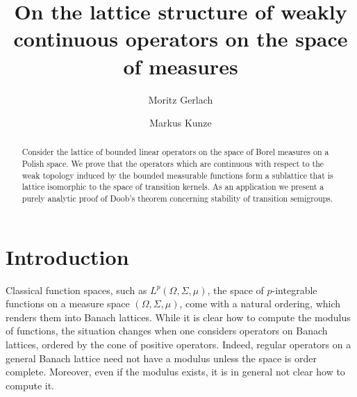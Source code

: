 \documentclass{amsart}
\numberwithin{equation}{section}
\theoremstyle{remark}
\theoremstyle{definition}
\begin{document}
\title[Lattice of weakly continuous operators]{On the lattice structure of weakly continuous operators on the space of measures}
\author{Moritz Gerlach}
\address{Moritz Gerlach\\University of Ulm\\Institute of Applied Analysis\\89069 Ulm\\Germany}

\author{Markus Kunze}
\address{Markus Kunze\\DFG Research Training Group 1100\\University of Ulm\\89069 Ulm\\Germany}
\begin{abstract}
Consider the lattice of bounded linear operators on the space of Borel measures on a Polish space. We prove
that the operators which are continuous with respect to the weak topology induced by the bounded measurable functions form a sublattice
that is lattice isomorphic to the space of transition kernels.
As an application we present a purely analytic proof of Doob's theorem concerning stability of transition semigroups.
\end{abstract}


\maketitle

\section{Introduction}

Classical function spaces, such as 
$L^p(\Omega,\Sigma,\mu)$, the space of $p$-integrable functions on a measure space $(\Omega,\Sigma,\mu)$,
come with a natural ordering, which renders them into Banach lattices.
While it is clear how to compute the modulus of functions, the situation changes when one considers
operators on Banach lattices, ordered by the cone of positive operators.
Indeed, regular operators on a general Banach lattice 
need not have a modulus unless the space is order complete.
Moreover, even if the modulus exists, it is in general not clear how to compute it.
\end{document}

